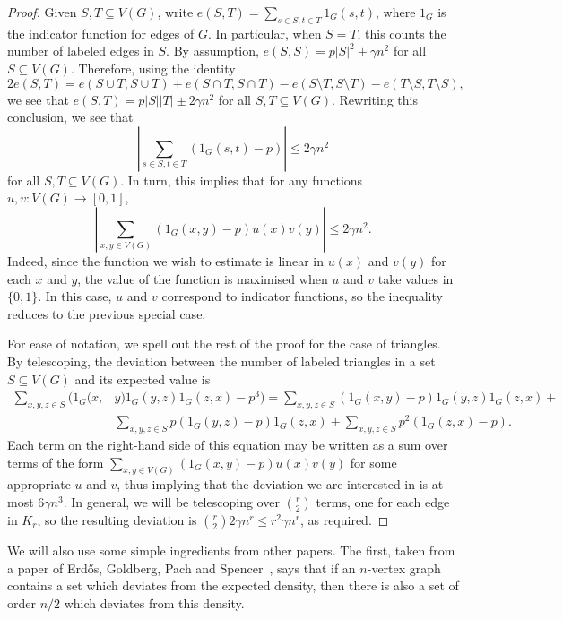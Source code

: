 \documentclass[11pt]{article}
\begin{document}
\begin{proof}
Given $S, T \subseteq V(G)$, write $e(S, T) = \sum_{s \in S, t \in T} 1_G(s,t)$, where $1_G$ is the indicator function for edges of $G$. In particular, when $S = T$, this counts the number of labeled edges in $S$. By assumption, $e(S, S) = p |S|^2 \pm \gamma n^2$ for all $S \subseteq V(G)$. Therefore, using the identity 
\[2e(S, T) = e(S\cup T, S \cup T) + e(S\cap T, S \cap T) - e(S \setminus T, S \setminus T) - e(T \setminus S, T \setminus S),\]
we see that $e(S, T) = p |S||T| \pm 2 \gamma n^2$ for all $S, T \subseteq V(G)$. Rewriting this conclusion, we see that
\[|\sum_{s \in S, t \in T} (1_G(s,t) - p)| \leq 2 \gamma n^2\]
for all $S, T \subseteq V(G)$.
In turn, this implies that for any functions $u, v: V(G) \rightarrow [0,1]$,
\[|\sum_{x, y \in V(G)} (1_G(x,y) - p) u(x) v(y)| \leq 2 \gamma n^2.\]
Indeed, since the function we wish to estimate is linear in $u(x)$ and $v(y)$ for each $x$ and $y$, the value of the function is maximised when $u$ and $v$ take values in $\{0,1\}$. In this case, $u$ and $v$ correspond to indicator functions, so the inequality reduces to the previous special case.

For ease of notation, we spell out the rest of the proof for the case of triangles. By telescoping, the deviation between the number of labeled triangles in a set $S \subseteq V(G)$ and its expected value is
\begin{align*}
\sum_{x, y, z \in S} (1_G(x,& y) 1_G(y,z) 1_G(z,x) - p^3) = \sum_{x,y,z \in S} (1_G(x,y) - p) 1_G(y,z) 1_G(z,x) + \\
& \sum_{x,y,z \in S} p (1_G(y,z) - p) 1_G(z,x) + \sum_{x,y,z \in S} p^2 (1_G(z,x) - p).
\end{align*}
Each term on the right-hand side of this equation may be written as a sum over terms of the form $\sum_{x, y \in V(G)} (1_G(x,y) - p) u(x) v(y)$ for some appropriate $u$ and $v$, thus implying that the deviation we are interested in is at most $6 \gamma n^3$. In general, we will be telescoping over $\binom{r}{2}$ terms, one for each edge in $K_r$, so the resulting deviation is $\binom{r}{2} 2 \gamma n^r \leq r^2 \gamma n^r$, as required.
\end{proof}

We will also use some simple ingredients from other papers. The first, taken from a paper of Erd\H{o}s, Goldberg, Pach and Spencer~\cite{EGPS}, says that if an $n$-vertex graph contains a set which deviates from the expected density, then there is also a set of order $n/2$ which deviates from this density.
\end{document}

